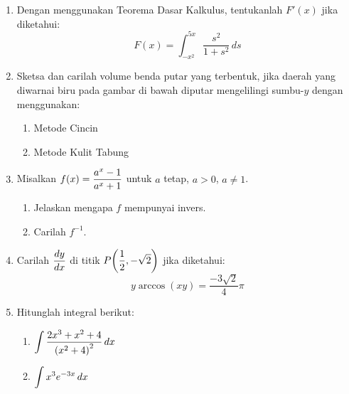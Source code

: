 \begin{enumerate}[leftmargin=*, label={\arabic*}.]
\item Dengan menggunakan Teorema Dasar Kalkulus, tentukanlah $F'(x)$ jika diketahui:
\[
F(x) = \int_{-x^{2}}^{5x}\frac{s^{2}}{1+s^{2}}\,ds
\]
\item Sketsa dan carilah volume benda putar yang terbentuk, jika daerah yang 
diwarnai biru pada gambar di bawah diputar mengelilingi sumbu-$y$ dengan 
menggunakan:
\begin{enumerate}[label={\alph*}.]
    \item Metode Cincin
    \item Metode Kulit Tabung
\end{enumerate}
\begin{center}
\end{center}

\item Misalkan $\ds f(x)=\frac{a^{x}-1}{a^{x}+1}$ untuk $a$ tetap, $a>0$, $a\neq 1$.
\begin{enumerate}[label={\alph*}.]
    \item Jelaskan mengapa $f$ mempunyai invers.
    \item Carilah $f^{-1}$.
\end{enumerate}
\item Carilah $\ds \frac{dy}{dx}$ di titik $\ds P\brk*{\frac{1}{2},-\sqrt{2}}$ jika diketahui:
\[
y\arccos(xy) = \frac{-3\sqrt{2}}{4}\pi
\]
\item Hitunglah integral berikut:
\begin{enumerate}[label={\alph*}.]
    \item $\ds \int\frac{2x^{3}+x^{2}+4}{\brk*{x^{2}+4}^{2}}\,dx$
    \item $\ds \int x^{3}e^{-3x}\,dx$
\end{enumerate}
\end{enumerate}
